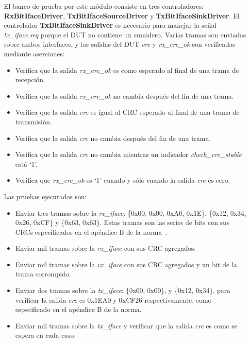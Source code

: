 \documentclass[a4paper, twoside, 11pt]{report}
\begin{document}
El banco de prueba por este módulo consiste en tres controladores: \textbf{RxBitIfaceDriver}, \textbf{TxBitIfaceSourceDriver} y \textbf{TxBitIfaceSinkDriver}. El controlador  \textbf{TxBitIfaceSinkDriver} es necesario para manejar la señal \textit{tx\_iface.req} porque el DUT no contiene un sumidero. Varias tramas son enviadas sobre ambos interfaces, y las salidas del DUT \textit{crc} y \textit{rx\_crc\_ok} son verificadas mediante aserciones:

\begin{itemize}
  \item Verifica que la salida \textit{rx\_crc\_ok} es como esperado al final de una trama de recepción.
  \item Verifica que la salida \textit{rx\_crc\_ok} no cambia después del fin de una trama.
  \item Verifica que la salida \textit{crc} es igual al CRC esperado al final de una trama de transmisión.
  \item Verifica que la salida \textit{crc} no cambia después del fin de una trama.
  \item Verifica que la salida \textit{crc} no cambia mientras un indicador \textit{check\_crc\_stable} está ‘1’.
  \item Verifica que \textit{rx\_crc\_ok} es ‘1’ cuando y sólo cuando la salida \textit{crc} es cero.
\end{itemize}

Las pruebas ejecutados son:

\begin{itemize}
  \item Enviar tres tramas sobre la \textit{rx\_iface}: \{0x00, 0x00, 0xA0, 0x1E\}, \{0x12, 0x34, 0x26, 0xCF\} y \{0x63, 0x63\}. Estas tramas son las series de bits con sus CRCs especificados en el apéndice B de la norma~\cite{iso14443-3}.
  \item Enviar mil tramas sobre la \textit{rx\_iface} con sus CRC agregados.
  \item Enviar mil tramas sobre la \textit{rx\_iface} con sus CRC agregados y un bit de la trama corrompido.
  \item Enviar dos tramas sobre la \textit{tx\_iface}: \{0x00, 0x00\}, y \{0x12, 0x34\}, para verificar la salida \textit{crc} es 0x1EA0 y 0xCF26 respectivamente, como especificado en el apéndice B de la norma.
  \item Enviar mil tramas sobre la \textit{tx\_iface} y verificar que la salida \textit{crc} es como se espera en cada caso.
\end{itemize}
\end{document}
